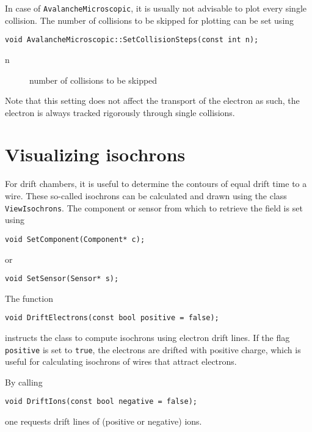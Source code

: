 In case of \texttt{AvalancheMicroscopic}, it is usually not advisable to 
plot every single collision. The number of collisions 
to be skipped for plotting can be set using
\begin{lstlisting}
void AvalancheMicroscopic::SetCollisionSteps(const int n);
\end{lstlisting}
\begin{description}
  \item[n] number of collisions to be skipped
\end{description}
Note that this setting does not affect the transport of the electron as such, 
the electron is always tracked rigorously through single collisions.

\section{Visualizing isochrons}

For drift chambers, it is useful to determine the contours of equal drift time to a wire.
These so-called isochrons can be calculated and drawn 
using the class \texttt{ViewIsochrons}.
The component or sensor from which to retrieve the field is set using
\begin{lstlisting}
void SetComponent(Component* c);
\end{lstlisting}
or
\begin{lstlisting}
void SetSensor(Sensor* s);
\end{lstlisting}

The function
\begin{lstlisting}
void DriftElectrons(const bool positive = false);
\end{lstlisting}
instructs the class to compute isochrons using electron drift lines.
If the flag \texttt{positive} is set to \texttt{true}, the electrons 
are drifted with positive charge,
which is useful for calculating isochrons of wires that attract electrons.

By calling
\begin{lstlisting}
void DriftIons(const bool negative = false);
\end{lstlisting}
one requests drift lines of (positive or negative) ions.

